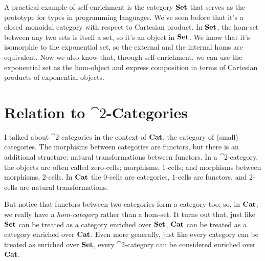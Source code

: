 A practical example of self-enrichment is the category $\mathbf{Set}$ that
serves as the prototype for types in programming languages. We've seen
before that it's a closed monoidal category with respect to Cartesian
product. In $\mathbf{Set}$, the hom-set between any two sets is itself a
set, so it's an object in $\mathbf{Set}$. We know that it's isomorphic to
the exponential set, so the external and the internal homs are
equivalent. Now we also know that, through self-enrichment, we can use
the exponential set as the hom-object and express composition in terms
of Cartesian products of exponential objects.

\section{Relation to $\cat{2}$-Categories}

I talked about $\cat{2}$-categories in the context of $\mathbf{Cat}$, the category
of (small) categories. The morphisms between categories are functors,
but there is an additional structure: natural transformations between
functors. In a $\cat{2}$-category, the objects are often called zero-cells;
morphisms, $1$-cells; and morphisms between morphisms, $2$-cells. In
$\mathbf{Cat}$ the $0$-cells are categories, $1$-cells are functors, and
$2$-cells are natural transformations.

But notice that functors between two categories form a category too; so,
in $\mathbf{Cat}$, we really have a \emph{hom-category} rather than a
hom-set. It turns out that, just like $\mathbf{Set}$ can be treated as a
category enriched over $\mathbf{Set}$, $\mathbf{Cat}$ can be treated as a
category enriched over $\mathbf{Cat}$. Even more generally, just like
every category can be treated as enriched over $\mathbf{Set}$, every
$\cat{2}$-category can be considered enriched over $\mathbf{Cat}$.
